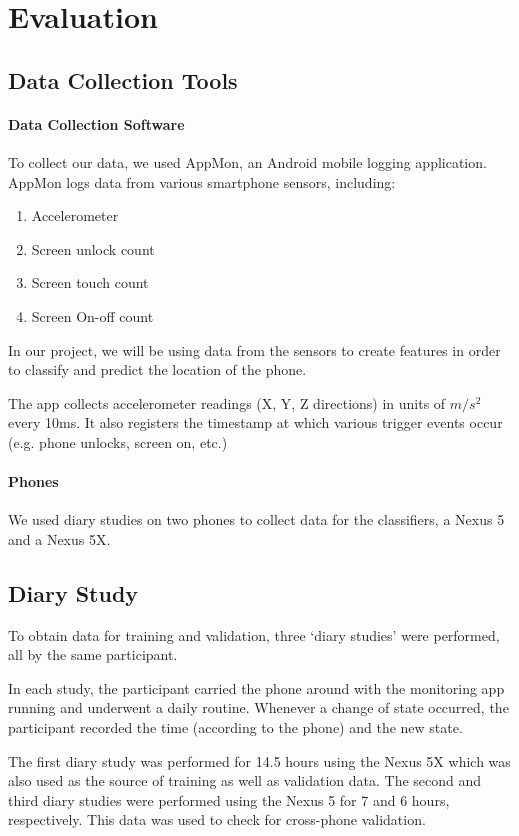 \section{Evaluation}

\subsection{Data Collection Tools}
\paragraph{Data Collection Software}
To collect our data, we used AppMon, an Android mobile logging application.
AppMon logs data from various smartphone sensors, including:
\begin{enumerate}
\item Accelerometer
\item Screen unlock count
\item Screen touch count
\item Screen On-off count
\end{enumerate}

In our project, we will be using data from the sensors
to create features in order to classify and predict the location of the phone. 

The app collects accelerometer readings (X, Y, Z directions) in units of $m/s^2$ every 10ms.
It also registers the timestamp at which various trigger events occur (e.g. phone unlocks, screen on, etc.)

\paragraph{Phones}
We used diary studies on two phones to collect data for the classifiers,
 a Nexus 5 and a Nexus 5X.


\subsection {Diary Study}
To obtain data for training and validation, three `diary studies' were performed, all by the same participant.

In each study, the participant carried the phone around with the monitoring app running and underwent a daily routine.
Whenever a change of state occurred, the participant recorded the time (according to the phone) and the new state.

The first diary study was performed for 14.5 hours using the Nexus 5X which was also used as the source of training as well as validation data.
The second and third diary studies were performed using the Nexus 5 for 7 and 6 hours, respectively.
This data was used to check for cross-phone validation.


